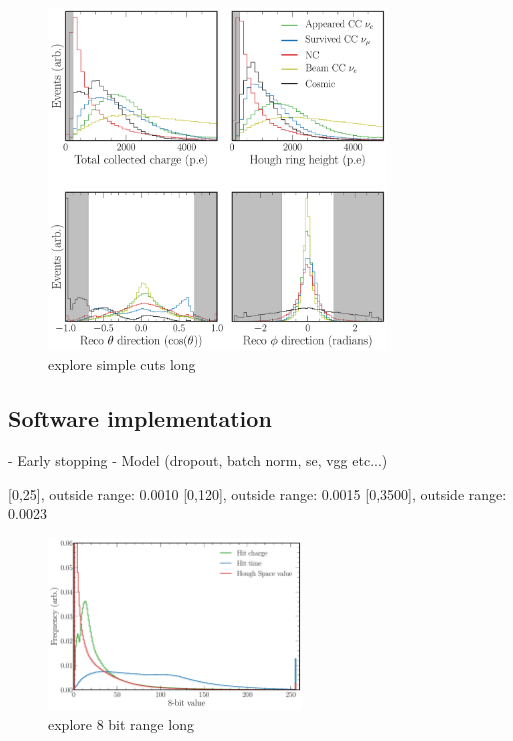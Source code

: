 \begin{figure} %
    \includegraphics[width=0.8\textwidth]{diagrams/7-cvn/chipsnet/explore_simple_cuts.pdf}
    \caption[explore simple cuts short]
    {explore simple cuts long}
    \label{fig:explore_simple_cuts}
\end{figure}

\subsection{Software implementation} %
\label{sec:cvn_baseline_soft} %

- Early stopping
- Model (dropout, batch norm, se, vgg etc...)

[0,25], outside range: 0.0010
    [0,120], outside range: 0.0015
    [0,3500], outside range: 0.0023

\begin{figure} %
    \includegraphics[width=0.6\textwidth]{diagrams/7-cvn/chipsnet/explore_8_bit_range.pdf}
    \caption[explore 8 bit range short]
    {explore 8 bit range long}
    \label{fig:explore_8_bit_range}
\end{figure}

